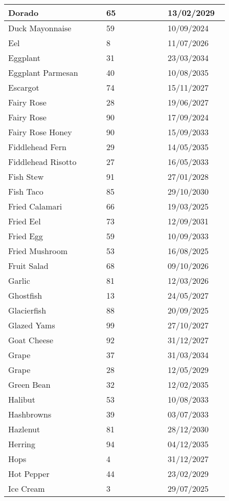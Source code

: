 \documentclass{article}
\begin{document}
\begin{longtable}{|p{0.4\linewidth}|p{0.25\linewidth}|p{0.25\linewidth}|}
\hline
Dorado & 65 & 13/02/2029 \\
\hline
Duck Mayonnaise & 59 & 10/09/2024 \\
\hline
Eel & 8 & 11/07/2026 \\
\hline
Eggplant & 31 & 23/03/2034 \\
\hline
Eggplant Parmesan & 40 & 10/08/2035 \\
\hline
Escargot & 74 & 15/11/2027 \\
\hline
Fairy Rose & 28 & 19/06/2027 \\
\hline
Fairy Rose & 90 & 17/09/2024 \\
\hline
Fairy Rose Honey & 90 & 15/09/2033 \\
\hline
Fiddlehead Fern & 29 & 14/05/2035 \\
\hline
Fiddlehead Risotto & 27 & 16/05/2033 \\
\hline
Fish Stew & 91 & 27/01/2028 \\
\hline
Fish Taco & 85 & 29/10/2030 \\
\hline
Fried Calamari & 66 & 19/03/2025 \\
\hline
Fried Eel & 73 & 12/09/2031 \\
\hline
Fried Egg & 59 & 10/09/2033 \\
\hline
Fried Mushroom & 53 & 16/08/2025 \\
\hline
Fruit Salad & 68 & 09/10/2026 \\
\hline
Garlic & 81 & 12/03/2026 \\
\hline
Ghostfish & 13 & 24/05/2027 \\
\hline
Glacierfish & 88 & 20/09/2025 \\
\hline
Glazed Yams & 99 & 27/10/2027 \\
\hline
Goat Cheese & 92 & 31/12/2027 \\
\hline
Grape & 37 & 31/03/2034 \\
\hline
Grape & 28 & 12/05/2029 \\
\hline
Green Bean & 32 & 12/02/2035 \\
\hline
Halibut & 53 & 10/08/2033 \\
\hline
Hashbrowns & 39 & 03/07/2033 \\
\hline
Hazlenut & 81 & 28/12/2030 \\
\hline
Herring & 94 & 04/12/2035 \\
\hline
Hops & 4 & 31/12/2027 \\
\hline
Hot Pepper & 44 & 23/02/2029 \\
\hline
Ice Cream & 3 & 29/07/2025 \\
\hline

\end{longtable}
\end{document}

